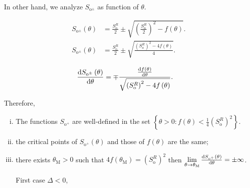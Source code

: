 \documentclass[
    8pt,
    aspectratio=1610,
    c,
    intlimits,
    leqno,
    professionalfonts,
]{beamer}
\begin{document}
\begin{frame}
	In other hand, we analyze $S_{\text{o}^{\pm}}$ as function of
	$\theta$.

	\begin{align*}
		S_{\text{o}^{\pm}}\left(\theta\right) & =
		\frac{S^{R}_{\text{o}}}{2}\pm
		\sqrt{\left(\frac{S^{R}_{\text{o}}}{2}\right)^{2}-f\left(\theta\right)}. \\
		S_{\text{o}^{\pm}}\left(\theta\right) & =
		\frac{S^{R}_{\text{o}}}{2}\pm
		\sqrt{\frac{\left(S^{R}_{\text{o}}\right)^{2}-4f\left(\theta\right)}{4}}.
	\end{align*}

	\begin{align*}
		\diff{S_{\text{o}^{\pm}}\left(\theta\right)}{\theta} & =
		\mp\frac{
			\diff{f\left(\theta\right)}{\theta}
		}{\sqrt{
				{\left(S^{R}_{\text{o}}\right)}^{2}-4f\left(\theta\right)}
		}.
	\end{align*}

	Therefore,
	\begin{enumerate}[i.]
		\item

		      The functions $S_{\text{o}^{+}}$ are well-defined in the
		      set
		      \begin{math}
			      \left\{
			      \theta>0:
			      f\left(\theta\right)<
			      \frac{1}{4}{\left(S^{R}_{\text{o}}\right)}^{2}
			      \right\}
		      \end{math}.

		\item

		      the critical points of $S_{\text{o}^{+}}\left(\theta\right)$
		      and those of $f\left(\theta\right)$ are the same;

		\item

		      there exists $\theta_{\text{M}}>0$ such that
		      \begin{math}
			      4f\left(\theta_{\text{M}}\right)=
			      {\left(S^{R}_{\text{o}}\right)}^{2}
		      \end{math}
		      then
		      \begin{math}
			      \lim\limits_{\theta\to\theta_{\text{M}}}
			      \diff{S_{\text{o}^{+}}\left(\theta\right)}{\theta}=
			      \pm\infty
		      \end{math}.

		      \begin{description}
			      \item[First case $\Delta<0$,]


\end{description}
\end{enumerate}
\end{frame}
\end{document}
